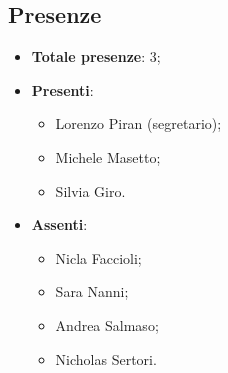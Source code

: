 \documentclass[11pt]{article}
\begin{document}
	\subsection{Presenze}
	\begin{itemize}
		\item \textbf{Totale presenze}: 3;
		\item \textbf{Presenti}:
		\begin{itemize}
			\item Lorenzo Piran (segretario);
			\item Michele Masetto;
			\item Silvia Giro.
		\end{itemize}
		\item \textbf{Assenti}:
		\begin{itemize}
			\item Nicla Faccioli;
			\item Sara Nanni;
			\item Andrea Salmaso;
			\item Nicholas Sertori.
		\end{itemize}
	\end{itemize}

	\newpage
\end{document}
